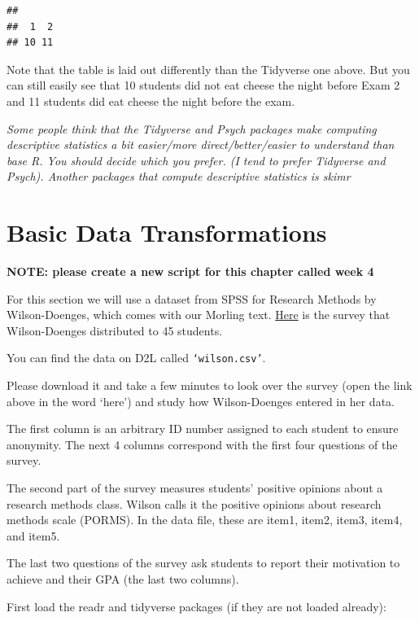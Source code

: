 \documentclass[
]{book}
\begin{document}
\begin{verbatim}
## 
##  1  2 
## 10 11
\end{verbatim}

Note that the table is laid out differently than the Tidyverse one above. But you can still easily see that 10 students did not eat cheese the night before Exam 2 and 11 students did eat cheese the night before the exam.

\emph{Some people think that the Tidyverse and Psych packages make computing descriptive statistics a bit easier/more direct/better/easier to understand than base R. You should decide which you prefer. (I tend to prefer Tidyverse and Psych). Another packages that compute descriptive statistics is skimr }

\hypertarget{basic-data-transformations}{%
\chapter{Basic Data Transformations}\label{basic-data-transformations}}

\textbf{NOTE: please create a new script for this chapter called week 4}

For this section we will use a dataset from SPSS for Research Methods by Wilson-Doenges, which comes with our Morling text. \href{https://docs.google.com/document/d/1V1vHljcqtVYXE-2iHcdcR0FNzjdCmJXc6Je5TuWMPuk/edit?usp=sharing}{Here} is the survey that Wilson-Doenges distributed to 45 students.

You can find the data on D2L called \texttt{‘wilson.csv’}.

Please download it and take a few minutes to look over the survey (open the link above in the word `here') and study how Wilson-Doenges entered in her data.

The first column is an arbitrary ID number assigned to each student to ensure anonymity. The next 4 columns correspond with the first four questions of the survey.

The second part of the survey measures students' positive opinions about a research methods class. Wilson calls it the positive opinions about research methods scale (PORMS). In the data file, these are item1, item2, item3, item4, and item5.

The last two questions of the survey ask students to report their motivation to achieve and their GPA (the last two columns).

First load the readr and tidyverse packages (if they are not loaded already):
\end{document}
